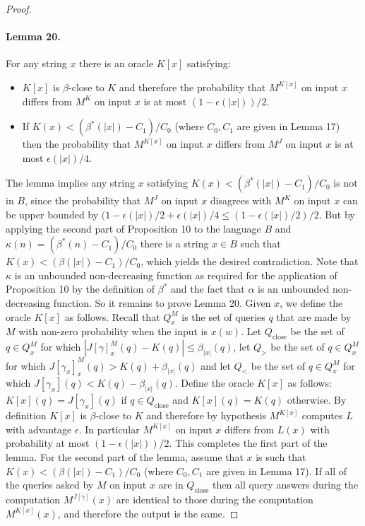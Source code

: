 \begin{proof}
\paragraph{Lemma 20.}
For any string $x$ there is an oracle $K[x]$ satisfying:
\begin{itemize}
\item $K[x]$ is $\beta$-close to $K$ and therefore the probability that $M^{K[x]}$ on input $x$ differs from $M^K$ on input $x$ is at most $(1-\epsilon(|x|))/2$.
\item If $K(x)<(\beta^*(|x|)-C_1)/C_0$ (where $C_0,C_1$ are given in Lemma 17) then the probability that $M^{K[x]}$ on input $x$ differs from $M^J$ on input $x$ is at most $\epsilon(|x|)/4$.
\end{itemize}
The lemma implies any string $x$ satisfying $K(x)<(\beta^*(|x|)-C_1)/C_0$ is not in $B$, since the probability that $M^J$ on input $x$ disagrees with $M^K$ on input $x$ can be upper bounded by $(1-\epsilon(|x|)/2+\epsilon(|x|)/4\leq(1-\epsilon(|x|)/2)/2$. But by applying the second part of Proposition 10 to the language $B$ and $\kappa(n)=(\beta^*(n)-C_1)/C_0$ there is a string $x\in B$ such that $K(x)<(\beta(|x|)-C_1)/C_0$, which yields the desired contradiction. Note that $\kappa$ is an unbounded non-decreasing function as required for the application of Proposition 10 by the definition of $\beta^*$ and the fact that $\alpha$ is an unbounded non-decreasing function.
So it remains to prove Lemma 20. Given $x$, we define the oracle $K[x]$ as follows. Recall that $Q_x^M$ is the set of queries $q$ that are made by $M$ with non-zero probability when the input is $x(w)$. Let $Q_{\mathrm{close}}$ be the set of $q\in Q_x^M$ for which $|J[\gamma]_x^M(q)-K(q)|\leq\beta_{|x|}(q)$, let $Q_>$ be the set of $q\in Q_x^M$ for which $J[\gamma_x]_x^M(q)>K(q)+\beta_{|x|}(q)$ and let $Q_<$ be the set of $q\in Q_x^M$ for which $J[\gamma_x](q)<K(q)-\beta_{|x|}(q)$. Define the oracle $K[x]$ as follows: $K[x](q)=J[\gamma_x](q)$ if $q\in Q_{\mathrm{close}}$ and $K[x](q)=K(q)$ otherwise.
By definition $K[x]$ is $\beta$-close to $K$ and therefore by hypothesis $M^{K[x]}$ computes $L$ with advantage $\epsilon$. In particular $M^{K[x]}$ on input $x$ differs from $L(x)$ with probability at most $(1-\epsilon(|x|))/2$. This completes the first part of the lemma.
For the second part of the lemma, assume that $x$ is such that $K(x)<(\beta(|x|)-C_1)/C_0$ (where $C_0,C_1$ are given in Lemma 17).
If all of the queries asked by $M$ on input $x$ are in $Q_{\mathrm{close}}$ then all query answers during the computation $M^{J[\gamma]}(x)$ are identical to those during the computation $M^{K[x]}(x)$, and therefore the output is the same.

\end{proof}
